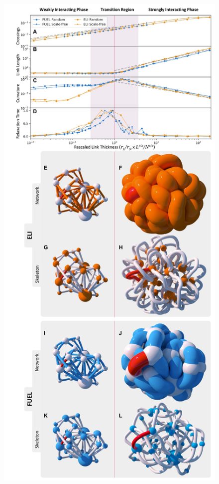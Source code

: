 \documentclass[linenumbers,endfloats,nofootinbib,preprint,floatfix,titlepage,superscriptaddress]{revtex4-1} %
\begin{document}
\begin{figure}
\centering
\includegraphics[height=.77\textheight,trim=0 1cm 0 6cm]{fig-09-19/3d-phase-compare-041018.pdf}

\end{figure}
\end{document}
